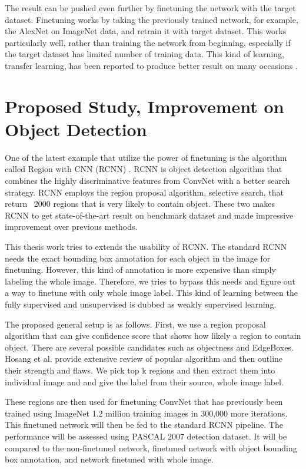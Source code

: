 \documentclass[a4paper,11pt]{kth-mag}
\begin{document}
The result can be pushed even further by finetuning the network with the target dataset. Finetuning works by taking the previously trained network, for example, the AlexNet on ImageNet data, and retrain it with target dataset. This works particularly well, rather than training the network from beginning, especially if the target dataset has limited number of training data. This kind of learning, transfer learning, has been reported to produce better result on many occasions \cite{azizpour2014}.

\section{Proposed Study, Improvement on Object Detection}
One of the latest example that utilize the power of finetuning is the algorithm called Region with CNN (RCNN) \cite{girshick2014rcnn}. RCNN is object detection algorithm that combines the highly discriminative features from ConvNet with a better search strategy. RCNN employs the region proposal algorithm, selective search, that return ~2000 regions that is very likely to contain object. These two makes RCNN to get state-of-the-art result on benchmark dataset and made impressive improvement over previous methods.

This thesis work tries to extends the usability of RCNN. The standard RCNN needs the exact bounding box annotation for each object in the image for finetuning. However, this kind of annotation is more expensive than simply labeling the whole image. Therefore, we tries to bypass this needs and figure out a way to finetune with only whole image label. This kind of learning between the fully supervised and unsupervised is dubbed as weakly supervised learning.

The proposed general setup is as follows. First, we use a region proposal algorithm that can give confidence score that shows how likely a region to contain object. There are several possible candidates such as objectness \cite{obj} and EdgeBoxes. Hosang et al. \cite{hosang2014} provide extensive review of popular algorithm and then outline their strength and flaws. We pick top k regions and then extract them into individual image and and give the label from their source, whole image label.

These regions are then used for finetuning ConvNet that has previously been trained using ImageNet 1.2 million training images in 300,000 more iterations. This finetuned network will then be fed to the standard RCNN pipeline. The performance will be assessed using PASCAL 2007 detection dataset. It will be compared to the non-finetuned network, finetuned network with object bounding box annotation, and network finetuned with whole image.
\end{document}
